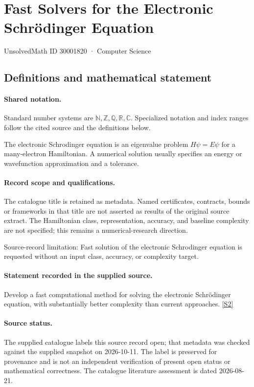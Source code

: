 \documentclass[11pt]{article}
\newcommand{\sref}[2]{\hyperlink{source:#1:#2}{[S#2]}}
\begin{document}
\setcounter{section}{30001819}
\section{Fast Solvers for the Electronic Schrödinger Equation}\label{30001820}
{\small\sffamily UnsolvedMath ID 30001820 · Computer Science}
\subsection{Definitions and mathematical statement}

\paragraph{Shared notation.}Standard number systems are $\mathbb N,\mathbb Z,\mathbb Q,\mathbb R,\mathbb C$. Specialized notation and index ranges follow the cited source and the definitions below.


The electronic Schrodinger equation is an eigenvalue problem $H\psi=E\psi$ for a many-electron Hamiltonian. A numerical solution usually specifies an energy or wavefunction approximation and a tolerance.
\paragraph{Record scope and qualifications.}
The catalogue title is retained as metadata. Named certificates, contracts, bounds or frameworks in that title are not asserted as results of the original source extract.
The Hamiltonian class, representation, accuracy, and baseline complexity are not specified; this remains a numerical-research direction.

Source-record limitation: Fast solution of the electronic Schrodinger equation is requested without an input class, accuracy, or complexity target.
\paragraph{Statement recorded in the supplied source.}
Develop a fast computational method for solving the electronic Schrödinger equation, with substantially better complexity than current approaches. \sref{30001820}{2}
\paragraph{Source status.}
The supplied catalogue labels this source record open; that metadata was checked against the supplied snapshot on 2026-10-11. The label is preserved for provenance and is not an independent verification of present open status or mathematical correctness. The catalogue literature assessment is dated 2026-08-21.
\end{document}
